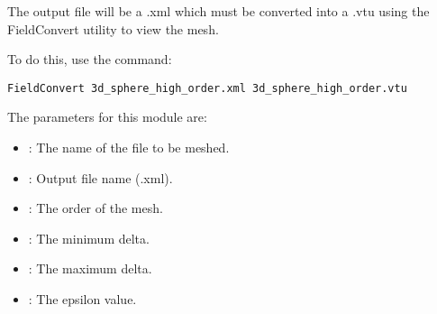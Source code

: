 The output file will be a .xml which must be converted into a .vtu using the FieldConvert utility to view the mesh.

To do this, use the command:

\begin{lstlisting}[style=BashInputStyle]
FieldConvert 3d_sphere_high_order.xml 3d_sphere_high_order.vtu
\end{lstlisting}

The parameters for this module are:

\begin{itemize}
  \item {}: The name of the file to be meshed.
  \item {}: Output file name (.xml).
  \item {}: The order of the mesh.
  \item {}: The minimum delta.
  \item {}: The maximum delta.
  \item {}: The epsilon value.
\end{itemize}
